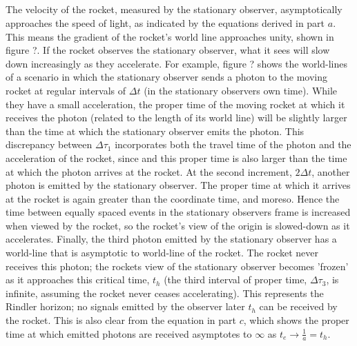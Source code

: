 \documentclass[a4paper]{article}
\begin{document}
\subsection{}
The velocity of the rocket, measured by the stationary observer, asymptotically approaches the speed of light, as indicated by the equations derived in part $a$. 
This means the gradient of the rocket's world line approaches unity, shown in figure ?. 
If the rocket observes the stationary observer, what it sees will slow down increasingly as they accelerate.
For example, figure ? shows the world-lines of a scenario in which the stationary observer sends a photon to the moving rocket at regular intervals of $\Delta t$ (in the stationary observers own time).
While they have a small acceleration, the proper time of the moving rocket at which it receives the photon (related to the length of its world line) will be slightly larger than the time at which the stationary observer emits the photon. This discrepancy between $\Delta \tau_1$ incorporates both the travel time of the photon and the acceleration of the rocket, since and this proper time is also larger than the time at which the photon arrives at the rocket.
At the second increment, $2\Delta t$, another photon is emitted by the stationary observer.
The proper time at which it arrives at the rocket is again greater than the coordinate time, and moreso. 
Hence the time between equally spaced events in the stationary observers frame is increased when viewed by the rocket, so the rocket's view of the origin is slowed-down as it accelerates.
Finally, the third photon emitted by the stationary observer has a world-line that is asymptotic to world-line of the rocket. 
The rocket never receives this photon; the rockets view of the stationary observer becomes 'frozen' as it approaches this critical time, $t_h$ (the third interval of proper time, $\Delta \tau_3$, is infinite, assuming the rocket never ceases accelerating).
This represents the Rindler horizon; no signals emitted by the observer later $t_h$ can be received by the rocket.
This is also clear from the equation in part $c$, which shows the proper time at which emitted photons are received asymptotes to $\infty$ as $t_e \to \frac{1}{a} = t_h$.



\section{}
\end{document}
